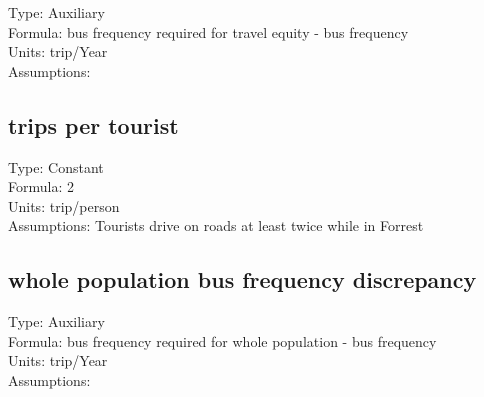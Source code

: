 \documentclass[
  11pt,
]{book}
\begin{document}
Type: Auxiliary\\
Formula: bus frequency required for travel equity - bus frequency\\
Units: trip/Year\\
Assumptions:

\hypertarget{trips-per-tourist}{%
\subsection{trips per tourist}\label{trips-per-tourist}}

Type: Constant\\
Formula: 2\\
Units: trip/person\\
Assumptions: Tourists drive on roads at least twice while in Forrest

\hypertarget{whole-population-bus-frequency-discrepancy}{%
\subsection{whole population bus frequency discrepancy}\label{whole-population-bus-frequency-discrepancy}}

Type: Auxiliary\\
Formula: bus frequency required for whole population - bus frequency\\
Units: trip/Year\\
Assumptions:

  
\end{document}
